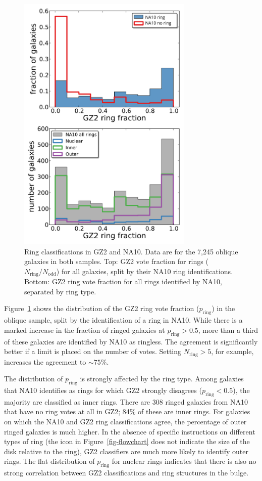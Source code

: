 \documentclass[useAMS,usenatbib]{mn2e}
\begin{document}
\begin{figure}
\includegraphics[angle=0,width=3.3in]{figures/na_gz2_rings_labelfixed.pdf} %
\caption{Ring classifications in GZ2 and NA10. Data are for the 7,245 oblique galaxies in both samples. Top: GZ2 vote fraction for rings ($N_\mathrm{ring}/N_\mathrm{odd}$) for all galaxies, split by their NA10 ring identifications. Bottom: GZ2 ring vote fraction for all rings identified by NA10, separated by ring type.
\label{fig-na_rings}}
\end{figure}

Figure~\ref{fig-na_rings} shows the distribution of the GZ2 ring vote fraction ($p_\mathrm{ring}$) in the oblique sample, split by the identification of a ring in NA10. While there is a marked increase in the fraction of ringed galaxies at $p_\mathrm{ring}>0.5$, more than a third of these galaxies are identified by NA10 as ringless. The agreement is significantly better if a limit is placed on the number of votes. Setting $N_\mathrm{ring} > 5$, for example, increases the agreement to $\sim75\%$. 

The distribution of $p_\mathrm{ring}$ is strongly affected by the ring type. Among galaxies that NA10 identifies as rings for which GZ2 strongly disagrees ($p_\mathrm{ring}<0.5$), the majority are classified as inner rings. There are 308 ringed galaxies from NA10 that have no ring votes at all in GZ2; 84\% of these are inner rings. For galaxies on which the NA10 and GZ2 ring classifications agree, the percentage of outer ringed galaxies is much higher. In the absence of specific instructions on different types of ring (the icon in Figure~\ref{fig-flowchart} does not indicate the size of the disk relative to the ring), GZ2 classifiers are much more likely to identify outer rings. The flat distribution of $p_\mathrm{ring}$ for nuclear rings indicates that there is also no strong correlation between GZ2 classifications and ring structures in the bulge. 
\end{document}
